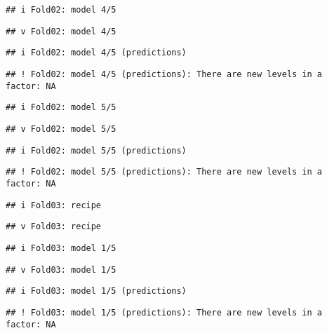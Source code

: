 \documentclass[
]{article}
\begin{document}
\begin{verbatim}
## i Fold02: model 4/5
\end{verbatim}

\begin{verbatim}
## v Fold02: model 4/5
\end{verbatim}

\begin{verbatim}
## i Fold02: model 4/5 (predictions)
\end{verbatim}

\begin{verbatim}
## ! Fold02: model 4/5 (predictions): There are new levels in a factor: NA
\end{verbatim}

\begin{verbatim}
## i Fold02: model 5/5
\end{verbatim}

\begin{verbatim}
## v Fold02: model 5/5
\end{verbatim}

\begin{verbatim}
## i Fold02: model 5/5 (predictions)
\end{verbatim}

\begin{verbatim}
## ! Fold02: model 5/5 (predictions): There are new levels in a factor: NA
\end{verbatim}

\begin{verbatim}
## i Fold03: recipe
\end{verbatim}

\begin{verbatim}
## v Fold03: recipe
\end{verbatim}

\begin{verbatim}
## i Fold03: model 1/5
\end{verbatim}

\begin{verbatim}
## v Fold03: model 1/5
\end{verbatim}

\begin{verbatim}
## i Fold03: model 1/5 (predictions)
\end{verbatim}

\begin{verbatim}
## ! Fold03: model 1/5 (predictions): There are new levels in a factor: NA
\end{verbatim}
\end{document}
